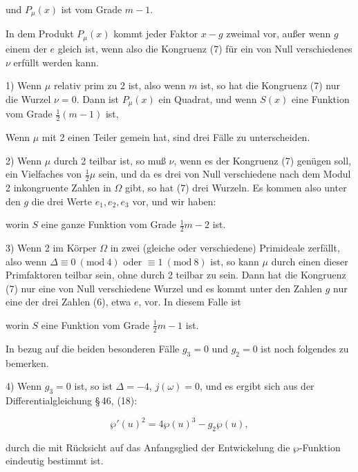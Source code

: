 

und $P_\mu(x)$ ist vom Grade $m - 1$.

In dem Produkt $P_\mu(x)$ kommt jeder Faktor $x - g$ zweimal vor, außer wenn $g$ einem der $e$ gleich ist, wenn also die Kongruenz (7) für ein von Null verschiedenes $\nu$ erfüllt werden kann.

1) Wenn $\mu$ relativ prim zu 2 ist, also wenn $m$  ist, so hat die Kongruenz (7) nur die Wurzel $\nu = 0$. Dann ist $P_\mu(x)$ ein Quadrat, und wenn $S(x)$ eine Funktion vom Grade $\frac{1}{2}(m - 1)$ ist,


Wenn $\mu$ mit 2 einen Teiler gemein hat, sind drei Fälle zu unterscheiden.

2) Wenn $\mu$ durch 2 teilbar ist, so muß $\nu$, wenn es der Kongruenz (7) genügen soll, ein Vielfaches von $\frac{1}{2}\mu$ sein, und da es drei von Null verschiedene nach dem Modul 2 inkongruente Zahlen in $\Omega$ gibt, so hat (7) drei Wurzeln. Es kommen also unter den $g$ die drei Werte $e_1, e_2, e_3$ vor, und wir haben:


worin $S$ eine ganze Funktion vom Grade $\frac{1}{2}m - 2$ ist.

3) Wenn 2 im Körper $\Omega$ in zwei (gleiche oder verschiedene) Primideale zerfällt, also wenn $\Delta \equiv 0 \ (\mathrm{mod}\ 4)$ oder $\equiv 1 \ (\mathrm{mod}\ 8)$ ist, so kann $\mu$ durch einen dieser Primfaktoren teilbar sein, ohne durch 2 teilbar zu sein. Dann hat die Kongruenz (7) nur eine von Null verschiedene Wurzel und es kommt unter den Zahlen $g$ nur eine der drei Zahlen (6), etwa $e$, vor. In diesem Falle ist


worin $S$ eine Funktion vom Grade $\frac{1}{2}m - 1$ ist.

In bezug auf die beiden besonderen Fälle $g_3 = 0$ und $g_2 = 0$ ist noch folgendes zu bemerken.

4) Wenn $g_3 = 0$ ist, so ist $\Delta = -4$, $j(\omega) = 0$, und es ergibt sich aus der Differentialgleichung §\,46, (18):

\[
\wp'(u)^2 = 4\wp(u)^3 - g_2 \wp(u),
\]

durch die mit Rücksicht auf das Anfangsglied der Entwickelung die $\wp$-Funktion eindeutig bestimmt ist.
